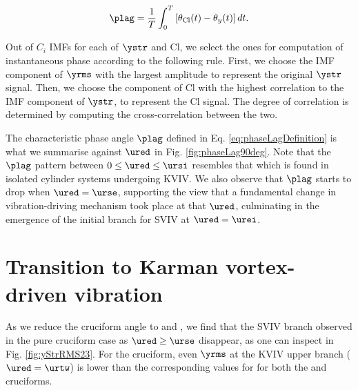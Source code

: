 \documentclass[a4paper,fleqn]{cas-sc}
\begin{document}
\begin{equation}
  \plag = \frac{1}{T} \int_{0}^{T} \left[ \theta_{\text{Cl}}(t) - \theta_{y}(t) \right] dt.
  \label{eq:phaseLagDefinition}
\end{equation}

Out of $C_{i}$ IMFs for each of $\ystr$ and Cl, we select the ones for computation of instantaneous phase according to the following rule. First, we choose the IMF component of $\yrms$ with the largest \rms{} amplitude to represent the original $\ystr$ signal. Then, we choose the component of Cl with the highest correlation to the IMF component of $\ystr$, to represent the Cl signal. The degree of correlation is determined by computing the cross-correlation between the two.

The characteristic phase angle $\plag$ defined in Eq. \ref{eq:phaseLagDefinition} is what we summarise against $\ured$ in Fig. \ref{fig:phaseLag90deg}. Note that the $\plag$ pattern between $0 \leq \ured \leq \ursi$ resembles that which is found in isolated cylinder systems undergoing KVIV. We also observe that $\plag$ starts to drop when $\ured = \urse$, supporting the view that a fundamental change in vibration-driving mechanism took place at that $\ured$, culminating in the emergence of the initial branch for SVIV at $\ured = \urei$.

\section{Transition to Karman vortex-driven vibration}\label{sec:transitionToKarman}

As we reduce the cruciform angle to \angfo{} and \angth{}, we find that the SVIV branch observed in the pure cruciform case as $\ured \geq \urse$ disappear, as one can inspect in Fig. \ref{fig:yStrRMS23}. For the \angth{} cruciform, even $\yrms$ at the KVIV upper branch ($\ured = \urtw$) is lower than the corresponding values for for both the \angfi{} and \angfo{} cruciforms.
\end{document}
